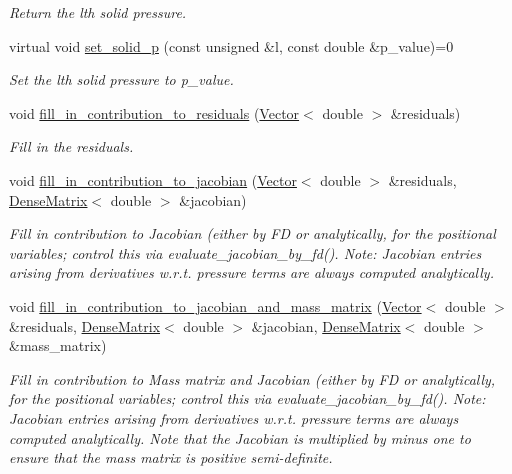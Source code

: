 \begin{DoxyCompactItemize}
\begin{DoxyCompactList}\small\item\em Return the lth solid pressure. \end{DoxyCompactList}\item 
virtual void \hyperlink{classoomph_1_1PVDEquationsWithPressure_a35b462a689e05929fa15a9abd2b920f0}{set\+\_\+solid\+\_\+p} (const unsigned \&l, const double \&p\+\_\+value)=0
\begin{DoxyCompactList}\small\item\em Set the lth solid pressure to p\+\_\+value. \end{DoxyCompactList}\item 
void \hyperlink{classoomph_1_1PVDEquationsWithPressure_a6e44d72eea0bbb65d43d01789fcf452c}{fill\+\_\+in\+\_\+contribution\+\_\+to\+\_\+residuals} (\hyperlink{classoomph_1_1Vector}{Vector}$<$ double $>$ \&residuals)
\begin{DoxyCompactList}\small\item\em Fill in the residuals. \end{DoxyCompactList}\item 
void \hyperlink{classoomph_1_1PVDEquationsWithPressure_ac1d61d6c3be895e5d033cfbcbfc8bd71}{fill\+\_\+in\+\_\+contribution\+\_\+to\+\_\+jacobian} (\hyperlink{classoomph_1_1Vector}{Vector}$<$ double $>$ \&residuals, \hyperlink{classoomph_1_1DenseMatrix}{Dense\+Matrix}$<$ double $>$ \&jacobian)
\begin{DoxyCompactList}\small\item\em Fill in contribution to Jacobian (either by FD or analytically, for the positional variables; control this via evaluate\+\_\+jacobian\+\_\+by\+\_\+fd(). Note\+: Jacobian entries arising from derivatives w.\+r.\+t. pressure terms are always computed analytically. \end{DoxyCompactList}\item 
void \hyperlink{classoomph_1_1PVDEquationsWithPressure_ab505539c0e5f904d34e698544142ef7a}{fill\+\_\+in\+\_\+contribution\+\_\+to\+\_\+jacobian\+\_\+and\+\_\+mass\+\_\+matrix} (\hyperlink{classoomph_1_1Vector}{Vector}$<$ double $>$ \&residuals, \hyperlink{classoomph_1_1DenseMatrix}{Dense\+Matrix}$<$ double $>$ \&jacobian, \hyperlink{classoomph_1_1DenseMatrix}{Dense\+Matrix}$<$ double $>$ \&mass\+\_\+matrix)
\begin{DoxyCompactList}\small\item\em Fill in contribution to Mass matrix and Jacobian (either by FD or analytically, for the positional variables; control this via evaluate\+\_\+jacobian\+\_\+by\+\_\+fd(). Note\+: Jacobian entries arising from derivatives w.\+r.\+t. pressure terms are always computed analytically. Note that the Jacobian is multiplied by minus one to ensure that the mass matrix is positive semi-\/definite. \end{DoxyCompactList}\item 

\end{DoxyCompactItemize}
